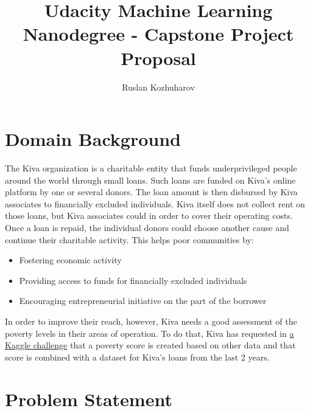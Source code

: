 \documentclass{article}
\title{Udacity Machine Learning Nanodegree - Capstone Project Proposal}
\author{Ruslan Kozhuharov}
\begin{document}
\maketitle
\tableofcontents
\newpage
{}
\setlength{\parskip}{1em}

\section{Domain Background}

The Kiva organization is a charitable entity that funds underprivileged people around the world through small loans. Such loans are funded on Kiva’s online platform by one or several donors. The loan amount is then disbursed by Kiva associates to financially excluded individuals. Kiva itself does not collect rent on those loans, but Kiva associates could in order to cover their operating costs. Once a loan is repaid, the individual donors could choose another cause and continue their charitable activity. This helps poor communities by:
\begin{itemize}
  \item Fostering economic activity
  \item Providing access to funds for financially excluded individuals
  \item Encouraging entrepreneurial initiative on the part of the borrower
\end{itemize}
In order to improve their reach, however, Kiva needs a good assessment of the poverty levels in their areas of operation. To do that, Kiva has requested in \href{https://www.kaggle.com/kiva/data-science-for-good-kiva-crowdfunding}{a Kaggle challenge} that a poverty score is created based on other data and that score is combined with a dataset for Kiva’s loans from the last 2 years.
\section{Problem Statement}
\end{document}
